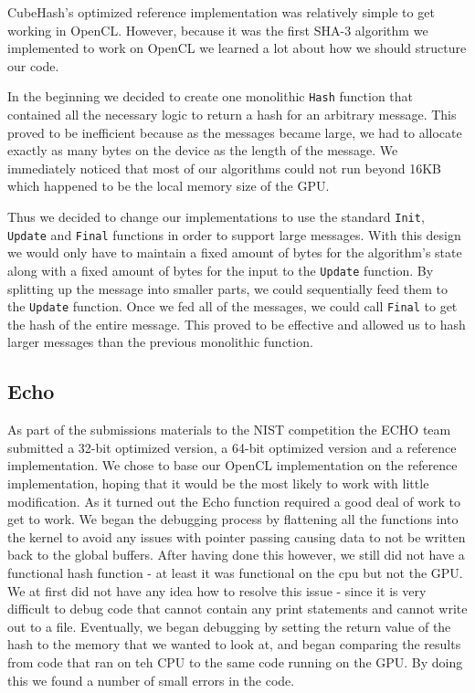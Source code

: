 CubeHash's optimized reference implementation was relatively simple to get working in OpenCL.
However, because it was the first SHA-3 algorithm we implemented to work on OpenCL we learned a lot about how we should structure our code.

In the beginning we decided to create one monolithic {\tt Hash} function that contained all the necessary logic to return a hash for an arbitrary message.
This proved to be inefficient because as the messages became large, we had to allocate exactly as many bytes on the device as the length of the message.
We immediately noticed that most of our algorithms could not run beyond 16KB which happened to be the local memory size of the GPU.

Thus we decided to change our implementations to use the standard {\tt Init}, {\tt Update} and {\tt Final} functions in order to support large messages.
With this design we would only have to maintain a fixed amount of bytes for the algorithm's state along with a fixed amount of bytes for the input to the {\tt Update} function.
By splitting up the message into smaller parts, we could sequentially feed them to the {\tt Update} function.
Once we fed all of the messages, we could call {\tt Final} to get the hash of the entire message.
This proved to be effective and allowed us to hash larger messages than the previous monolithic function.

\subsection*{Echo}

As part of the submissions materials to the NIST competition the ECHO team submitted a 32-bit optimized version, a 64-bit optimized version and a reference implementation.  
We chose to base our OpenCL implementation on the reference implementation, hoping that it would be the most likely to work with little modification.
As it turned out the Echo function required a good deal of work to get to work.
We began the debugging process by flattening all the functions into the kernel to avoid any issues with pointer passing causing data to not be written back to the global buffers.
After having done this however, we still did not have a functional hash function - at least it was functional on the cpu but not the GPU.  
We at first did not have any idea how to resolve this issue - since it is very difficult to debug code that cannot contain any print statements and cannot write out to a file. 
Eventually, we began debugging by setting the return value of the hash to the memory that we wanted to look at, and began comparing the results from code that ran on teh CPU to the same code running on the GPU.
By doing this we found a number of small errors in the code.

